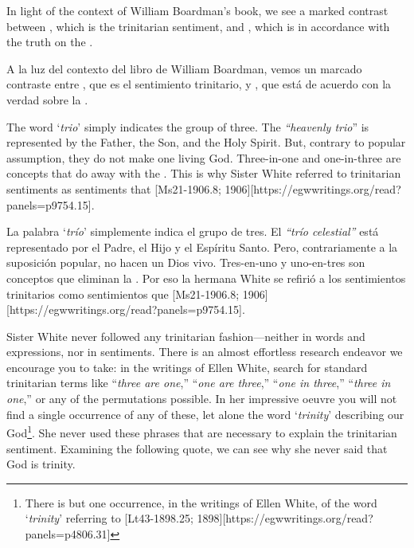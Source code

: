 In light of the context of William Boardman’s book, we see a marked contrast between , which is the trinitarian sentiment, and , which is in accordance with the truth on the .


A la luz del contexto del libro de William Boardman, vemos un marcado contraste entre , que es el sentimiento trinitario, y , que está de acuerdo con la verdad sobre la .


The word ‘\textit{trio}’ simply indicates the group of three. The \textit{“heavenly trio}” is represented by the Father, the Son, and the Holy Spirit. But, contrary to popular assumption, they do not make one living God. Three-in-one and one-in-three are concepts that do away with the . This is why Sister White referred to trinitarian sentiments as sentiments that [Ms21-1906.8; 1906][https://egwwritings.org/read?panels=p9754.15].


La palabra ‘\textit{trío}’ simplemente indica el grupo de tres. El \textit{“trío celestial”} está representado por el Padre, el Hijo y el Espíritu Santo. Pero, contrariamente a la suposición popular, no hacen un Dios vivo. Tres-en-uno y uno-en-tres son conceptos que eliminan la . Por eso la hermana White se refirió a los sentimientos trinitarios como sentimientos que [Ms21-1906.8; 1906][https://egwwritings.org/read?panels=p9754.15].


Sister White never followed any trinitarian fashion—neither in words and expressions, nor in sentiments. There is an almost effortless research endeavor we encourage you to take: in the writings of Ellen White, search for standard trinitarian terms like “\textit{three are one},” “\textit{one are three},” “\textit{one in three},” “\textit{three in one},” or any of the permutations possible. In her impressive oeuvre you will not find a single occurrence of any of these, let alone the word ‘\textit{trinity}’ describing our God\footnote{There is but one occurrence, in the writings of Ellen White, of the word ‘\textit{trinity}’ referring to [Lt43-1898.25; 1898][https://egwwritings.org/read?panels=p4806.31]}. She never used these phrases that are necessary to explain the trinitarian sentiment. Examining the following quote, we can see why she never said that God is trinity.


